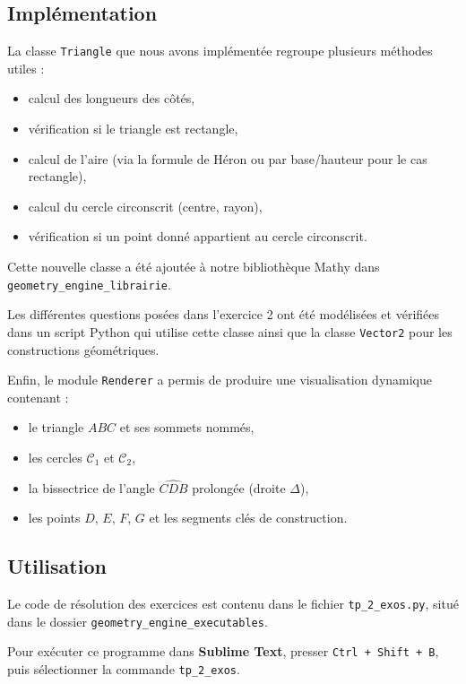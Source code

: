 \documentclass[a4paper,12pt]{article}
\begin{document}
\subsection*{Implémentation}

La classe \texttt{Triangle} que nous avons implémentée regroupe plusieurs méthodes utiles :
\begin{itemize}
    \item calcul des longueurs des côtés,
    \item vérification si le triangle est rectangle,
    \item calcul de l'aire (via la formule de Héron ou par base/hauteur pour le cas rectangle),
    \item calcul du cercle circonscrit (centre, rayon),
    \item vérification si un point donné appartient au cercle circonscrit.
\end{itemize}

Cette nouvelle classe a été ajoutée à notre bibliothèque Mathy dans \texttt{geometry\_engine\_librairie}.

Les différentes questions posées dans l'exercice 2 ont été modélisées et vérifiées dans un script Python qui utilise cette classe ainsi que la classe \texttt{Vector2} pour les constructions géométriques.

Enfin, le module \texttt{Renderer} a permis de produire une visualisation dynamique contenant :
\begin{itemize}
    \item le triangle $ABC$ et ses sommets nommés,
    \item les cercles $\mathcal{C}_1$ et $\mathcal{C}_2$,
    \item la bissectrice de l’angle $\widehat{CDB}$ prolongée (droite $\Delta$),
    \item les points $D$, $E$, $F$, $G$ et les segments clés de construction.
\end{itemize}

\subsection*{Utilisation}

Le code de résolution des exercices est contenu dans le fichier \texttt{tp\_2\_exos.py}, situé dans le dossier \texttt{geometry\_engine\_executables}.

Pour exécuter ce programme dans \textbf{Sublime Text}, presser \texttt{Ctrl + Shift + B}, puis sélectionner la commande \texttt{tp\_2\_exos}.
\end{document}
